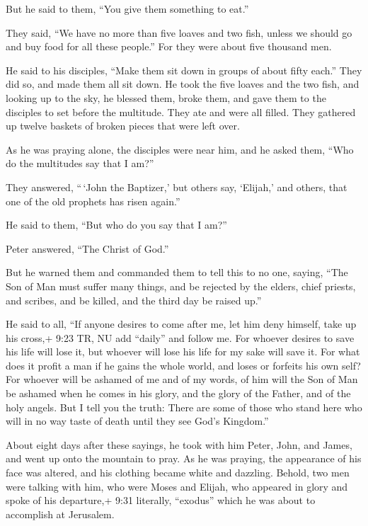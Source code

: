  But he said to them, ``You give them something to eat.''

They said, ``We have no more than five loaves and two fish, unless we
should go and buy food for all these people.''  For they
were about five thousand men.

He said to his disciples, ``Make them sit down in groups of about fifty
each.''  They did so, and made them all sit down.
 He took the five loaves and the two fish, and looking up
to the sky, he blessed them, broke them, and gave them to the disciples
to set before the multitude.  They ate and were all filled.
They gathered up twelve baskets of broken pieces that were left over.

 As he was praying alone, the disciples were near him, and
he asked them, ``Who do the multitudes say that I am?''

 They answered, ``\,`John the Baptizer,' but others say,
`Elijah,' and others, that one of the old prophets has risen again.''

 He said to them, ``But who do you say that I am?''

Peter answered, ``The Christ of God.''

 But he warned them and commanded them to tell this to no
one,  saying, ``The Son of Man must suffer many things, and
be rejected by the elders, chief priests, and scribes, and be killed,
and the third day be raised up.''

 He said to all, ``If anyone desires to come after me, let
him deny himself, take up his cross,+ 9:23 TR, NU add ``daily'' and
follow me.  For whoever desires to save his life will lose
it, but whoever will lose his life for my sake will save it.
 For what does it profit a man if he gains the whole world,
and loses or forfeits his own self?  For whoever will be
ashamed of me and of my words, of him will the Son of Man be ashamed
when he comes in his glory, and the glory of the Father, and of the holy
angels.  But I tell you the truth: There are some of those
who stand here who will in no way taste of death until they see God's
Kingdom.''

 About eight days after these sayings, he took with him
Peter, John, and James, and went up onto the mountain to pray.
 As he was praying, the appearance of his face was altered,
and his clothing became white and dazzling.  Behold, two
men were talking with him, who were Moses and Elijah,  who
appeared in glory and spoke of his departure,+ 9:31 literally,
``exodus'' which he was about to accomplish at Jerusalem.

